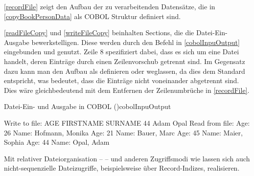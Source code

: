

\autoref{recordFile} zeigt den Aufbau der zu verarbeitenden Datensätze, die in \autoref{copyBookPersonData} als COBOL Struktur definiert sind.



\autoref{readFileCopy} und \autoref{writeFileCopy} beinhalten Sections, die die Datei-Ein- \bzw Ausgabe bewerkstelligen. Diese werden durch den  Befehl in \autoref{cobolInpuOutput} eingebunden und genutzt. Zeile 8 spezifiziert dabei, dass es sich um eine Datei handelt, deren Einträge durch einen Zeilenvorschub getrennt sind. Im Gegensatz dazu kann man den Aufbau als  \bzw {} definieren oder weglassen, da dies dem Standard entspricht, was bedeutet, dass die Einträge nicht voneinander abgetrennt sind. Dies wäre gleichbedeutend mit dem Entfernen der Zeilenumbrüche in \autoref{recordFile}.

\begin{codeWithCaption}{Datei-Ein- und Ausgabe in COBOL (\vgl \cite{university_of_limerick_department})}{cobolInpuOutput}
    \begin{shellwindow}
    Write to file:
    AGE FIRSTNAME SURNAME
     44      Adam    Opal
    Read from file:
    Age:  26 Name: Hofmann,    Monika
    Age:  21 Name:   Bauer,      Marc
    Age:  45 Name:   Maier,    Sophia
    Age:  44 Name:    Opal,      Adam
    \end{shellwindow}
\end{codeWithCaption}

Mit relativer Dateiorganisation --  -- und anderen Zugriffsmodi wie  lassen sich auch nicht-sequenzielle Dateizugriffe, beispielsweise über Record-Indizes, realisieren.